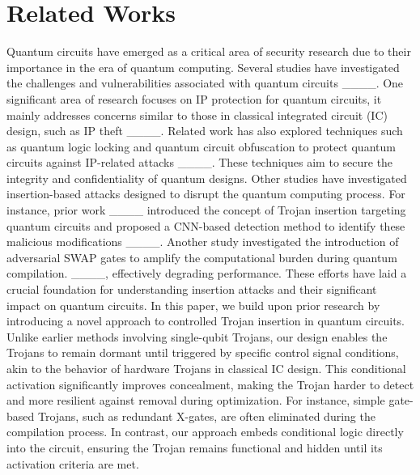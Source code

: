 \section{Related Works}
Quantum circuits have emerged as a critical area of security research due to their importance in the era of quantum computing. Several studies have investigated the challenges and vulnerabilities associated with quantum circuits ____. One significant area of research focuses on IP protection for quantum circuits, it mainly addresses concerns similar to those in classical integrated circuit (IC) design, such as IP theft ____. Related work has also explored techniques such as quantum logic locking and quantum circuit obfuscation to protect quantum circuits against IP-related attacks ____. These techniques aim to secure the integrity and confidentiality of quantum designs.
Other studies have investigated insertion-based attacks designed to disrupt the quantum computing process. For instance, prior work ____ introduced the concept of Trojan insertion targeting quantum circuits and proposed a CNN-based detection method to identify these malicious modifications ____. Another study investigated the introduction of adversarial SWAP gates to amplify the computational burden during quantum compilation. ____, effectively degrading performance. These efforts have laid a crucial foundation for understanding insertion attacks and their significant impact on quantum circuits.
In this paper, we build upon prior research by introducing a novel approach to controlled Trojan insertion in quantum circuits. Unlike earlier methods involving single-qubit Trojans, our design enables the Trojans to remain dormant until triggered by specific control signal conditions, akin to the behavior of hardware Trojans in classical IC design. This conditional activation significantly improves concealment, making the Trojan harder to detect and more resilient against removal during optimization. For instance, simple gate-based Trojans, such as redundant X-gates, are often eliminated during the compilation process. In contrast, our approach embeds conditional logic directly into the circuit, ensuring the Trojan remains functional and hidden until its activation criteria are met.